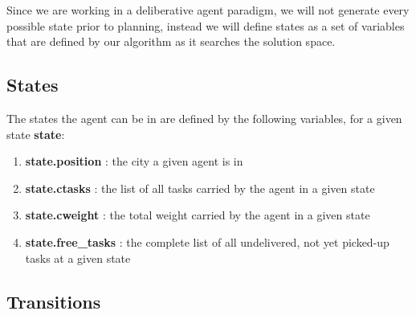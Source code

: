 \documentclass[11pt]{article}
\begin{document}
Since we are working in a deliberative agent paradigm, we will not generate every possible state prior to planning, instead we will define states as a set of variables that are defined by our algorithm as it searches the solution space.

\subsection{States}

The states the agent can be in are defined by the following variables, for a given state \textbf{state}:
\begin{enumerate}
    \item \textbf{state.position} : the city a given agent is in
    \item \textbf{state.ctasks} : the list of all tasks carried by the agent in a given state
    \item \textbf{state.cweight} : the total weight carried by the agent in a given state
    \item \textbf{state.free\_tasks} : the complete list of all undelivered, not yet picked-up tasks at a given state
\end{enumerate}

\subsection{Transitions}
\end{document}
